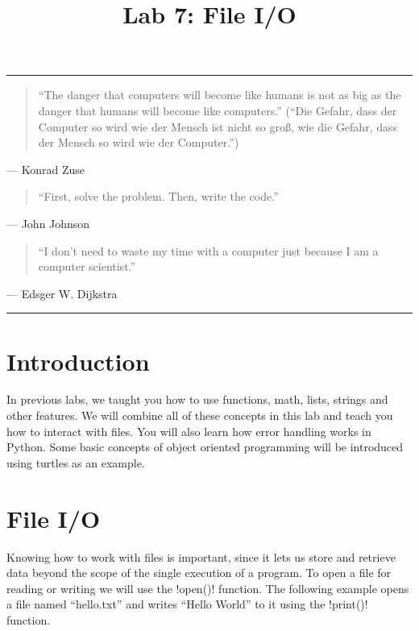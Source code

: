 \documentclass[11pt]{cselabheader}
\title{Lab 7: File I/O}
\begin{document}
\maketitle

\hrule
\begin{quotation}
``The danger that computers will become like humans is not as big as the danger
that humans will become like computers.'' (``Die Gefahr, dass der Computer so
wird wie der Mensch ist nicht so gro\ss, wie die Gefahr, dass der Mensch so wird
wie der Computer.'')
\end{quotation}
\begin{flushright}
--- Konrad Zuse
\end{flushright}

\begin{quotation}
``First, solve the problem. Then, write the code.''
\end{quotation}
\begin{flushright}
--- John Johnson
\end{flushright}

\begin{quotation}
``I don’t need to waste my time with a computer just because I am a computer
scientist.''
\end{quotation}
\begin{flushright}
--- Edsger W. Dijkstra
\end{flushright}

\hrule

\pagebreak
\section*{Introduction}

In previous labs, we taught you how to use functions, math, lists, strings and
other features. We will combine all of these concepts in this lab and teach you
how to interact with files. You will also learn how error handling works in
Python. Some basic concepts of object oriented programming will be introduced
using turtles as an example.

\tableofcontents

\pagebreak
{}
\section{File I/O}
Knowing how to work with files is important, since it lets us store and retrieve
data beyond the scope of the single execution of a program. To open a file for
reading or writing we will use the \pythoninline!open()! function. The
following example opens a file named ``hello.txt'' and writes ``Hello World''
to it using the \pythoninline!print()! function.
\end{document}
